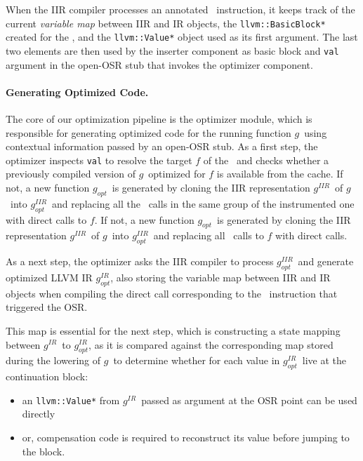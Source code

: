 When the IIR compiler processes an annotated \feval\ instruction, it keeps track of the current {\em variable map} between IIR and IR objects, the {\tt llvm::BasicBlock*} created for the \feval, and the {\tt llvm::Value*} object used as its first argument. The last two elements are then used by the inserter component as basic block and {\tt val} argument in the open-OSR stub that invokes the optimizer component.

\newcommand{\gBase}{$g$}
\newcommand{\gOpt}{$g_{opt}$}
\newcommand{\gIIR}{$g^{IIR}$}
\newcommand{\gIR}{$g^{IR}$}
\newcommand{\gOptIIR}{$g^{IIR}_{opt}$}
\newcommand{\gOptIR}{$g^{IR}_{opt}$}

\paragraph{Generating Optimized Code.}
The core of our optimization pipeline is the optimizer module, which is responsible for generating optimized code for the running function \gBase\ using contextual information passed by an open-OSR stub. As a first step, the optimizer inspects {\tt val} to resolve the target $f$ of the \feval\ and checks whether a previously compiled version of \gBase\ optimized for $f$ is available from the cache.
\ifdefined \fullver
If not, a new function \gOpt\ is generated by cloning the IIR representation \gIIR\ of \gBase\ into \gOptIIR\ and replacing all the \feval\ calls in the same group of the instrumented one with direct calls to $f$.
\else
If not, a new function \gOpt\ is generated by cloning the IIR representation \gIIR\ of \gBase\ into \gOptIIR\ and replacing all \feval\ calls to $f$ with direct calls.
\fi

As a next step, the optimizer asks the IIR compiler to process \gOptIIR\ and generate optimized LLVM IR \gOptIR, also storing the variable map between IIR and IR objects when compiling the direct call corresponding to the \feval\ instruction that triggered the OSR.
\ifdefined \fullver

\fi
This map is essential for the next step, which is constructing a state mapping between \gIR\ to \gOptIR, as it is compared against the corresponding map stored during the lowering of \gBase\ to determine whether for each value in \gOptIR\ live at the continuation block:
\begin{itemize}
\item an {\tt llvm::Value*} from \gIR\ passed as argument at the OSR point can be used directly
\item or, compensation code is required to reconstruct its value before jumping to the block.
\end{itemize}


